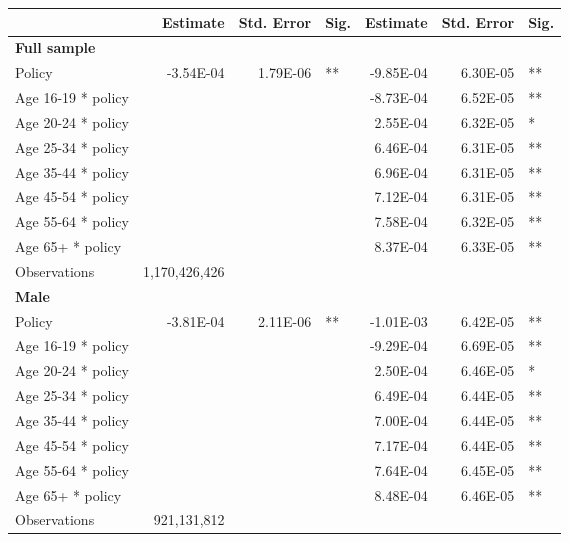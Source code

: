 
\begin{table}%
\centering 
\begin{tabular}{l r r l r r l} 

\hline 
 
 & Estimate & Std. Error & Sig. & Estimate & Std. Error & Sig. \\ 

\hline 
 
\textbf{Full sample} \\ 

Policy             &  -3.54E-04        &  1.79E-06       &   **       &  -9.85E-04        &  6.30E-05       &   **       \\ 
Age 16-19 * policy           & & &  &  -8.73E-04        &  6.52E-05       &   **       \\ 
Age 20-24 * policy           & & &  &  2.55E-04        &  6.32E-05       &    *       \\ 
Age 25-34 * policy           & & &  &  6.46E-04        &  6.31E-05       &   **       \\ 
Age 35-44 * policy           & & &  &  6.96E-04        &  6.31E-05       &   **       \\ 
Age 45-54 * policy           & & &  &  7.12E-04        &  6.31E-05       &   **       \\ 
Age 55-64 * policy           & & &  &  7.58E-04        &  6.32E-05       &   **       \\ 
Age 65+ * policy           & & &  &  8.37E-04        &  6.33E-05       &   **       \\ 
Observations & 1,170,426,426 \\ 


\hline 

\textbf{Male} \\ 

Policy             &  -3.81E-04        &  2.11E-06       &   **       &  -1.01E-03        &  6.42E-05       &   **       \\ 
Age 16-19 * policy           & & &  &  -9.29E-04        &  6.69E-05       &   **       \\ 
Age 20-24 * policy           & & &  &  2.50E-04        &  6.46E-05       &    *       \\ 
Age 25-34 * policy           & & &  &  6.49E-04        &  6.44E-05       &   **       \\ 
Age 35-44 * policy           & & &  &  7.00E-04        &  6.44E-05       &   **       \\ 
Age 45-54 * policy           & & &  &  7.17E-04        &  6.44E-05       &   **       \\ 
Age 55-64 * policy           & & &  &  7.64E-04        &  6.45E-05       &   **       \\ 
Age 65+ * policy           & & &  &  8.48E-04        &  6.46E-05       &   **       \\ 
Observations & 921,131,812 \\ 



\end{tabular}
\end{table}
